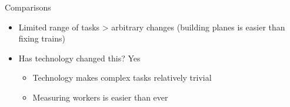 \documentclass[presentation]{subfiles}
\begin{document}
\begin{frame}
\begin{columns}

  \end{columns}


\end{frame}


\begin{frame}{Comparisons}
\begin{itemize}
  \item Limited range of tasks > arbitrary changes (building planes is easier than fixing trains)
  \item Has technology changed this? Yes
  \begin{itemize}
    \item Technology makes complex tasks relatively trivial
    \item Measuring workers is easier than ever
  \end{itemize}
\end{itemize}
\end{frame}
\end{document}
